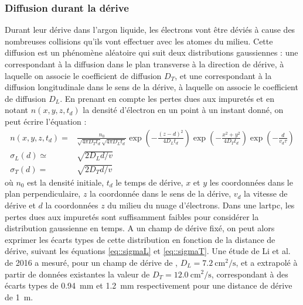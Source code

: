       \subsubsection{Diffusion durant la dérive}\label{sec::diffusion}

        Durant leur dérive dans l'argon liquide, les électrons vont être déviés à cause des nombreuses collisions qu'ils vont effectuer avec les atomes du milieu. Cette diffusion est un phénomène aléatoire qui suit deux distributions gaussiennes : une correspondant à la diffusion dans le plan transverse à la direction de dérive, à laquelle on associe le coefficient de diffusion $D_T$, et une correspondant à la diffusion longitudinale dans le sens de la dérive, à laquelle on associe le coefficient de diffusion $D_L$. En prenant en compte les pertes dues aux impuretés et en notant $n(x,y,z,t_d)$ la densité d'électron en un point à un instant donné, on peut écrire l'équation : 
        \begin{eqnarray}
          n(x,y,z,t_d) = & \frac{n_0}{\sqrt{4\pi D_T t_d}\sqrt{4\pi D_L t_d}}\exp\left(-\frac{(z-d)^2}{4D_L t_d}\right)\exp\left(-\frac{x^2+y^2}{4D_T t_d}\right)\exp\left(-\frac{d}{v_d\tau}\right) \label{eq::diffusion} \\
          \sigma_L(d) \simeq & \sqrt{2 D_L d/v} \label{eq::sigmaL} \\
          \sigma_T(d) = & \sqrt{2 D_T d/v} \label{eq::sigmaT}
        \end{eqnarray}
        où $n_0$ est la densité initiale, $t_d$ le temps de dérive, $x$ et $y$ les coordonnées dans le plan perpendiculaire, $z$ la coordonnée dans le sens de la dérive, $v_d$ la vitesse de dérive et $d$ la coordonnées $z$ du milieu du nuage d'électrons. Dans une \gls{lartpc}, les pertes dues aux impuretés sont suffisamment faibles pour considérer la distribution gaussienne en temps. A un champ de dérive fixé, on peut alors exprimer les écarts types de cette distribution en fonction de la distance de dérive, suivant les équations \eqref{eq::sigmaL} et \eqref{eq::sigmaT}. Une étude de Li et al. de 2016\cite{Li2015} a mesuré, pour un champ de dérive de \driftfield{}, $D_L=\SI{7.2}{\centi\meter\squared\per\second}$, et a extrapolé à partir de données existantes la valeur de $D_T=\SI{12.0}{\centi\meter\squared\per\second}$, correspondant à des écarts types de \SI{0.94}{\milli\meter} et \SI{1.2}{\milli\meter} respectivement pour une distance de dérive de \SI{1}{\meter}. %

    


\FloatBarrier

\printbibliography